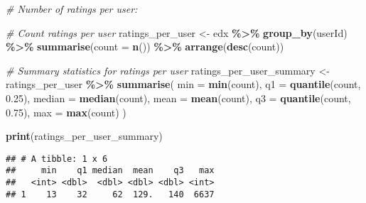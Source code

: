 \documentclass[
]{article}
\newenvironment{Shaded}{\begin{snugshade}}{\end{snugshade}}
\newcommand{\AttributeTok}[1]{\textcolor[rgb]{0.13,0.29,0.53}{#1}}
\newcommand{\CommentTok}[1]{\textcolor[rgb]{0.56,0.35,0.01}{\textit{#1}}}
\newcommand{\FloatTok}[1]{\textcolor[rgb]{0.00,0.00,0.81}{#1}}
\newcommand{\FunctionTok}[1]{\textcolor[rgb]{0.13,0.29,0.53}{\textbf{#1}}}
\newcommand{\NormalTok}[1]{#1}
\newcommand{\OtherTok}[1]{\textcolor[rgb]{0.56,0.35,0.01}{#1}}
\newcommand{\SpecialCharTok}[1]{\textcolor[rgb]{0.81,0.36,0.00}{\textbf{#1}}}
\begin{document}
\begin{Shaded}
\begin{Highlighting}[]
\CommentTok{\#  Number of ratings per user:}

\CommentTok{\# Count ratings per user}
\NormalTok{ratings\_per\_user }\OtherTok{\textless{}{-}}\NormalTok{ edx }\SpecialCharTok{\%\textgreater{}\%}
  \FunctionTok{group\_by}\NormalTok{(userId) }\SpecialCharTok{\%\textgreater{}\%}
  \FunctionTok{summarise}\NormalTok{(}\AttributeTok{count =} \FunctionTok{n}\NormalTok{()) }\SpecialCharTok{\%\textgreater{}\%}
  \FunctionTok{arrange}\NormalTok{(}\FunctionTok{desc}\NormalTok{(count))}

\CommentTok{\# Summary statistics for ratings per user}
\NormalTok{ratings\_per\_user\_summary }\OtherTok{\textless{}{-}}\NormalTok{ ratings\_per\_user }\SpecialCharTok{\%\textgreater{}\%}
  \FunctionTok{summarise}\NormalTok{(}
    \AttributeTok{min =} \FunctionTok{min}\NormalTok{(count),}
    \AttributeTok{q1 =} \FunctionTok{quantile}\NormalTok{(count, }\FloatTok{0.25}\NormalTok{),}
    \AttributeTok{median =} \FunctionTok{median}\NormalTok{(count),}
    \AttributeTok{mean =} \FunctionTok{mean}\NormalTok{(count),}
    \AttributeTok{q3 =} \FunctionTok{quantile}\NormalTok{(count, }\FloatTok{0.75}\NormalTok{),}
    \AttributeTok{max =} \FunctionTok{max}\NormalTok{(count)}
\NormalTok{  )}

\FunctionTok{print}\NormalTok{(ratings\_per\_user\_summary)}
\end{Highlighting}
\end{Shaded}

\begin{verbatim}
## # A tibble: 1 x 6
##     min    q1 median  mean    q3   max
##   <int> <dbl>  <dbl> <dbl> <dbl> <int>
## 1    13    32     62  129.   140  6637
\end{verbatim}
\end{document}
